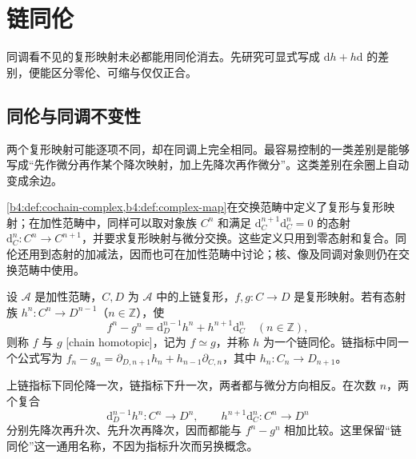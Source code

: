 
\section{链同伦}
\label{b4:sec:0601}

同调看不见的复形映射未必都能用同伦消去。先研究可显式写成 \(\mathrm{d}h+h\mathrm{d}\) 的差别，便能区分零伦、可缩与仅仅正合。

%
%

\subsection{同伦与同调不变性}
\label{b4:subsec:0601:01}

两个复形映射可能逐项不同，却在同调上完全相同。最容易控制的一类差别是能够写成“先作微分再作某个降次映射，加上先降次再作微分”。这类差别在余圈上自动变成余边。

\ProseParagraphBreak
\cref{b4:def:cochain-complex,b4:def:complex-map}在交换范畴中定义了复形与复形映射；在加性范畴中，同样可以取对象族 \(C^n\) 和满足 \(\mathrm{d}_C^{n+1}\mathrm{d}_C^n=0\) 的态射 \(\mathrm{d}_C^n:C^n\to C^{n+1}\)，并要求复形映射与微分交换。这些定义只用到零态射和复合。同伦还用到态射的加减法，因而也可在加性范畴中讨论；核、像及同调对象则仍在交换范畴中使用。

\begin{definition}\label{b4:def:chain-homotopy}
	设 \(\mathcal A\) 是加性范畴，\(C,D\) 为 \(\mathcal A\) 中的上链复形，\(f,g:C\to D\) 是复形映射。若有态射族 \(h^n:C^n\to D^{n-1}\)（\(n\in\mathbb Z\)），使
	\[
		f^n-g^n=\mathrm{d}_D^{n-1}h^n+h^{n+1}\mathrm{d}_C^n \quad(n\in\mathbb Z),
	\]
	则称 \(f\) 与 \(g\) [chain homotopic]，记为 \(f\simeq g\)，并称 \(h\) 为一个链同伦。链指标中同一个公式写为 \(f_n-g_n=\partial_{D,n+1}h_n+h_{n-1}\partial_{C,n}\)，其中 \(h_n:C_n\to D_{n+1}\)。
\end{definition}

上链指标下同伦降一次，链指标下升一次，两者都与微分方向相反。在次数 \(n\)，两个复合
\[
	\mathrm{d}_D^{n-1}h^n:C^n\longrightarrow D^n, \qquad h^{n+1}\mathrm{d}_C^n:C^n\longrightarrow D^n
\]
分别先降次再升次、先升次再降次，因而都能与 \(f^n-g^n\) 相加比较。这里保留“链同伦”这一通用名称，不因为指标升次而另换概念。

